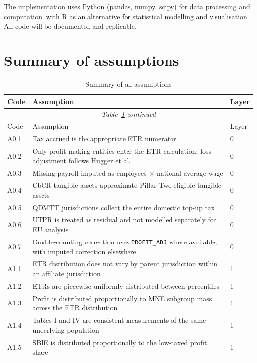 \documentclass[11pt,a4paper]{article}
\newcommand{\code}[1]{\texttt{#1}}
\begin{document}
The implementation uses Python (pandas, numpy, scipy) for data processing and computation, with R as an alternative for statistical modelling and visualisation. All code will be documented and replicable.

\section{Summary of assumptions}\label{sec:assumptions_summary}

\begin{longtable}{@{}lp{10cm}l@{}}
\caption{Summary of all assumptions}\label{tab:assumptions}\\
\toprule
Code & Assumption & Layer \\
\midrule
\endfirsthead
\multicolumn{3}{c}{\textit{Table~\ref{tab:assumptions} continued}}\\
\toprule
Code & Assumption & Layer \\
\midrule
\endhead
\bottomrule
\endlastfoot
A0.1 & Tax accrued is the appropriate ETR numerator & 0 \\
A0.2 & Only profit-making entities enter the ETR calculation; loss adjustment follows Hugger et al. & 0 \\
A0.3 & Missing payroll imputed as employees $\times$ national average wage & 0 \\
A0.4 & CbCR tangible assets approximate Pillar Two eligible tangible assets & 0 \\
A0.5 & QDMTT jurisdictions collect the entire domestic top-up tax & 0 \\
A0.6 & UTPR is treated as residual and not modelled separately for EU analysis & 0 \\
A0.7 & Double-counting correction uses \code{PROFIT\_ADJ} where available, with imputed correction elsewhere & 0 \\
A1.1 & ETR distribution does not vary by parent jurisdiction within an affiliate jurisdiction & 1 \\
A1.2 & ETRs are piecewise-uniformly distributed between percentiles & 1 \\
A1.3 & Profit is distributed proportionally to MNE subgroup mass across the ETR distribution & 1 \\
A1.4 & Tables I and IV are consistent measurements of the same underlying population & 1 \\
A1.5 & SBIE is distributed proportionally to the low-taxed profit share & 1 \\

\end{longtable}
\end{document}
